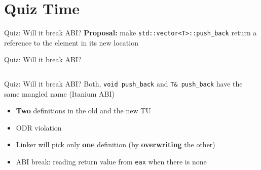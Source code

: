\section{Quiz Time}

\begin{frame}
    \centering
    \scalebox{3}{Quiz Time}
\end{frame}

\begin{frame}{Quiz: Will it break ABI?}
    \textbf{Proposal:} make \texttt{std::vector<T>::push\_back} return a reference to the element in its new location

    \vspace*{5mm}

    \centering


    \scalebox{2}{$\downarrow$}

\end{frame}

\begin{frame}[fragile]{Quiz: Will it break ABI?}
    \begin{columns}[t]
        \begin{column}{.4\textwidth}
        \end{column}
        \begin{column}{.5\textwidth}
        \end{column}
    \end{columns}
\end{frame}

\begin{frame}[fragile]{Quiz: Will it break ABI?}
    Both, \texttt{void push\_back} and \texttt{T\& push\_back} have the same mangled name (Itanium ABI)
    \begin{itemize}
        \item \textbf{Two} definitions in the old and the new TU
        \item ODR violation
        \item Linker will pick only \textbf{one} definition (by \textbf{overwriting} the other)
        \item \textcolor{vertexDarkRed}{ABI break:} reading return value from \texttt{eax} when there is none
    \end{itemize}
\end{frame}

